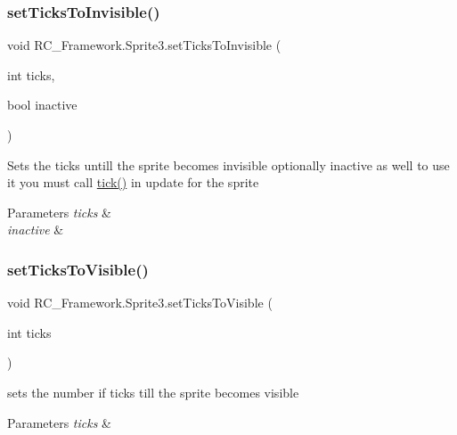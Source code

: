 \subsubsection{\texorpdfstring{set\+Ticks\+To\+Invisible()}{setTicksToInvisible()}}
{\footnotesize\ttfamily void R\+C\+\_\+\+Framework.\+Sprite3.\+set\+Ticks\+To\+Invisible (\begin{DoxyParamCaption}\item[{int}]{ticks,  }\item[{bool}]{inactive }\end{DoxyParamCaption})}



Sets the ticks untill the sprite becomes invisible optionally inactive as well to use it you must call \mbox{\hyperlink{class_r_c___framework_1_1_sprite3_aa6a483f4fdcd1ed260bd72f60a07834d}{tick()}} in update for the sprite 


\begin{DoxyParams}{Parameters}
{\em ticks} & \\
\hline
{\em inactive} & \\
\hline
\end{DoxyParams}
\mbox{\label{class_r_c___framework_1_1_sprite3_ab849638ba60bac0f9accbd4091f95d1e}} 
\subsubsection{\texorpdfstring{set\+Ticks\+To\+Visible()}{setTicksToVisible()}}
{\footnotesize\ttfamily void R\+C\+\_\+\+Framework.\+Sprite3.\+set\+Ticks\+To\+Visible (\begin{DoxyParamCaption}\item[{int}]{ticks }\end{DoxyParamCaption})}



sets the number if ticks till the sprite becomes visible 


\begin{DoxyParams}{Parameters}
{\em ticks} & \\
\hline
\end{DoxyParams}
\mbox{\label{class_r_c___framework_1_1_sprite3_a6c0cc3a2227564aba7ee4d66d0c620fe}} 
